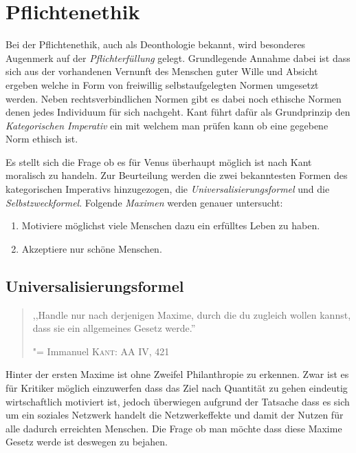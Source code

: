 \author{Autor: Vasilij Schneidermann}
\section{Pflichtenethik}

Bei der Pflichtenethik, auch als Deonthologie bekannt, wird besonderes
Augenmerk auf der \emph{Pflichterfüllung} gelegt.  Grundlegende
Annahme dabei ist dass sich aus der vorhandenen Vernunft des Menschen
guter Wille und Absicht ergeben welche in Form von freiwillig
selbstaufgelegten Normen umgesetzt werden.  Neben rechtsverbindlichen
Normen gibt es dabei noch ethische Normen denen jedes Individuum für
sich nachgeht.  Kant führt dafür als Grundprinzip den
\emph{Kategorischen Imperativ} ein mit welchem man prüfen kann ob eine
gegebene Norm ethisch ist.

Es stellt sich die Frage ob es für Venus überhaupt möglich ist nach
Kant moralisch zu handeln.  Zur Beurteilung werden die zwei
bekanntesten Formen des kategorischen Imperativs hinzugezogen, die
\emph{Universalisierungsformel} und die \emph{Selbstzweckformel}.
Folgende \emph{Maximen} werden genauer untersucht:

\begin{enumerate}
\item Motiviere möglichst viele Menschen dazu ein erfülltes Leben zu
  haben.
\item Akzeptiere nur schöne Menschen.
\end{enumerate}

\subsection{Universalisierungsformel}

\begin{quote}
,,Handle nur nach derjenigen Maxime, durch die du zugleich wollen kannst, dass sie ein allgemeines Gesetz werde.''

"= Immanuel \textsc{Kant}: AA IV, 421
\end{quote}

Hinter der ersten Maxime ist ohne Zweifel Philanthropie zu erkennen.
Zwar ist es für Kritiker möglich einzuwerfen dass das Ziel nach
Quantität zu gehen eindeutig wirtschaftlich motiviert ist, jedoch
überwiegen aufgrund der Tatsache dass es sich um ein soziales Netzwerk
handelt die Netzwerkeffekte und damit der Nutzen für alle dadurch
erreichten Menschen.  Die Frage ob man möchte dass diese Maxime Gesetz
werde ist deswegen zu bejahen.


